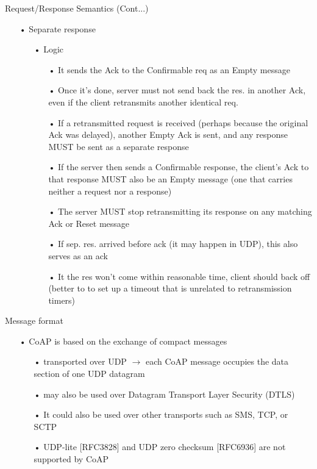 \documentclass[11pt]{beamer}
\begin{document}
\begin{frame}{Request/Response Semantics (Cont...)}
\begin{itemize}
\item[•] Separate response
\begin{itemize}
\item[•] Logic
\begin{itemize}
\item[•] It sends the Ack to the Confirmable req as an Empty message
\item[•] Once it's done, server must not send back the res. in another Ack, even if the client retransmits another identical req.
\item[•] If a retransmitted request is received (perhaps because the original Ack was delayed), another Empty Ack is sent, and any response MUST be sent as a separate response
\item[•] If the server then sends a Confirmable response, the client’s Ack to that response MUST also be an Empty message (one that carries neither a request nor a response)
\item[•] The server MUST stop retransmitting its response on any matching Ack or Reset message
\item[•] If sep. res. arrived before ack (it may happen in UDP), this also serves as an ack 
\item[•] It the res won't come within reasonable time, client should back off (better to to set up a timeout that is unrelated to retransmission timers)
\end{itemize}
\end{itemize}
\end{itemize}
\end{frame}
\begin{frame}{Message format}
\begin{itemize}
\item[•] CoAP is based on the exchange of compact messages
\begin{itemize}
\item[•] transported over UDP $\rightarrow$ each CoAP message occupies the data section of one UDP datagram
\item[•] may also be used over Datagram Transport Layer Security (DTLS)
\item[•] It could also be used over other transports such as SMS, TCP, or SCTP
\item[•] UDP-lite [RFC3828] and UDP zero checksum [RFC6936] are not supported by CoAP
\end{itemize}
\end{itemize}
\end{frame}
\end{document}
